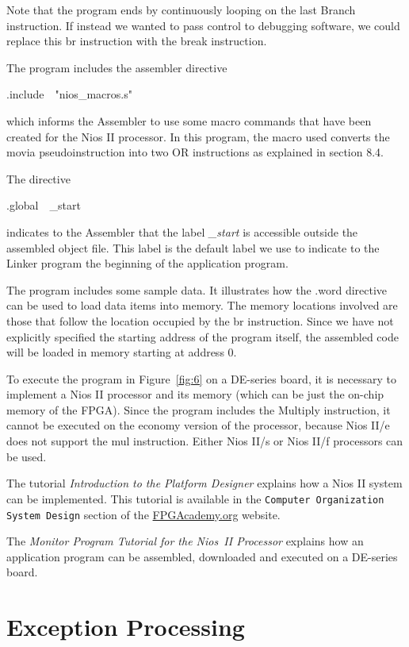 \documentclass[11pt, twoside, pdftex]{article}
\begin{document}
\noindent
Note that the program ends by continuously
looping on the last Branch instruction. If instead we wanted to pass control to
debugging software, we could replace this {\sf br} instruction with the {\sf break}
instruction.
  

The program includes the assembler directive
\begin{center}
{\sf .include~~"nios\_macros.s"}
\end{center}
\noindent
which informs the Assembler to use some macro commands that have been created
for the Nios II processor. In this program, the macro used
converts the {\sf movia} pseudoinstruction into two OR instructions as
explained in section 8.4.
 

The directive
\begin{center}
{\sf .global~~\_start}
\end{center} 
\noindent
indicates to the Assembler that the label {\it \_start} is accessible outside the
assembled object file. This label is the default label we use to indicate to
the Linker program the beginning of the application program.
 

The program includes some sample data. It illustrates how the {\sf .word} directive 
can be used to load data items into memory. The memory locations involved are those
that follow the location occupied by the {\sf br} instruction. 
Since we have not explicitly specified the starting address of the 
program itself, the assembled code will be loaded in memory starting 
at address 0.

To execute the program in Figure~\ref{fig:6} on a DE-series board, it is necessary to 
implement a Nios II processor and its memory (which can be just the on-chip memory of 
the FPGA). Since the program includes the Multiply instruction, it cannot
be executed on the economy version of the processor, because Nios II/e does not
support the {\sf mul} instruction. Either Nios II/s or Nios II/f processors can
be used.
 
The tutorial {\it Introduction to the Platform Designer} explains
how a Nios II system can be implemented. This tutorial is available in the 
\texttt{Computer Organization System Design} section of the 
{\small \href{https://www.fpgacademy.org/tutorials.html} {FPGAcademy.org}} website.

The {\it Monitor Program Tutorial for the Nios~II Processor} explains how an application 
program can be assembled, downloaded and executed on a DE-series board.

\section{Exception Processing}
\end{document}
